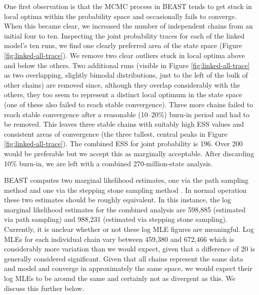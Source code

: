 \documentclass[]{article}
\begin{document}
One first observation is that the MCMC process in BEAST tends to get stuck in local optima within the probability space and occasionally fails to converge. When this became clear, we increased the number of independent chains from an initial four to ten. Inspecting the joint probability traces for each of the linked model's ten runs, we find one clearly preferred area of the state space (Figure \ref{fig:linked-all-trace}). We remove two clear outliers stuck in local optima above and below the others. Two additional runs (visible in Figure \ref{fig:linked-all-trace} as two overlapping, slightly bimodal distributions, just to the left of the bulk of other chains) are removed since, although they overlap considerably with the others, they too seem to represent a distinct local optimum in the state space (one of these also failed to reach stable convergence). Three more chains failed to reach stable convergence after a reasonable (10--20\%) burn-in period and had to be removed. This leaves three stable chains with suitably high ESS values and consistent areas of convergence (the three tallest, central peaks in Figure \ref{fig:linked-all-trace}). The combined ESS for joint probability is 196. Over 200 would be preferable but we accept this as marginally acceptable. After discarding 10\% burn-in, we are left with a combined 270-million-state analysis.

BEAST computes two marginal likelihood estimates, one via the path sampling method \autocite{baele_improving_2012} and one via the stepping stone sampling method \autocite{baele_accurate_2013}. In normal operation these two estimates should be roughly equivalent. In this instance, the log marginal likelihood estimates for the combined analysis are 598,885 (estimated via path sampling) and 988,231 (estimated via stepping stone sampling). Currently, it is unclear whether or not these log MLE figures are meaningful. Log MLEs for each individual chain vary between 459,380 and 672,466 which is considerably more variation than we would expect, given that a difference of 20 is generally considered significant. Given that all chains represent the same data and model and converge in approximately the same space, we would expect their log MLEs to be around the same and certainly not as divergent as this. We discuss this further below.
\end{document}
